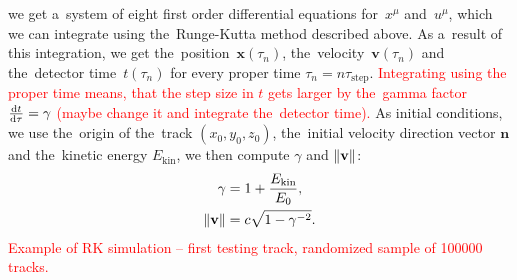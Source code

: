 		we get a~system of eight first order differential equations for~$x^\mu$ and~$u^\mu$, which we can integrate using the~Runge-Kutta method described above. As a~result of this integration, we get the~position~$\mathbf{x}(\tau_n)$, the~velocity~$\mathbf{v}(\tau_n)$ and the~detector time~$t(\tau_n)$ for every proper time $\tau_n = n \tau_\text{step}$. \textcolor{red}{Integrating using the proper time means, that the step size in $t$ gets larger by the~gamma factor $\derivative{t}{\tau} = \gamma$ (maybe change it and integrate the~detector time).} As initial conditions, we use the~origin of the~track $(x_0,y_0,z_0)$, the~initial velocity direction vector $\mathbf{n}$ and the~kinetic energy $E_\text{kin}$, we then compute $\gamma$ and $\norm{\mathbf{v}}$:
			\begin{align}
				\gamma &= 1 + \frac{E_\text{kin}}{E_0},\\
				\norm{\mathbf{v}} &= c\sqrt{1-\gamma^{-2}}.
			\end{align}
		\textcolor{red}{Example of RK simulation -- first testing track, randomized sample of 100000 tracks.}